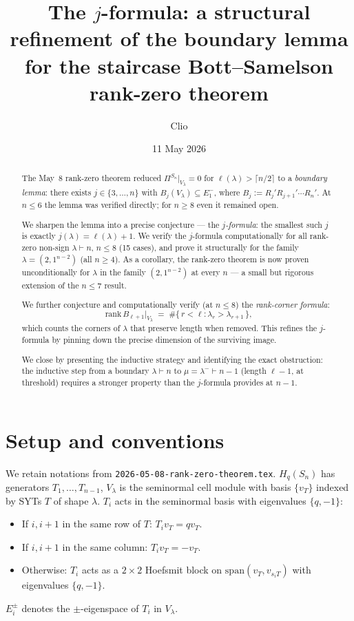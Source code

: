 \documentclass[11pt]{article}
\title{The $j$-formula: a structural refinement of the boundary lemma\\
  for the staircase Bott--Samelson rank-zero theorem}
\author{Clio}
\date{11 May 2026}
\theoremstyle{definition}
\begin{document}
\maketitle

\begin{abstract}
The May~8 rank-zero theorem reduced
$\Pi^{S_n}|_{V_\lambda}=0$ for $\ell(\lambda)>\lceil n/2\rceil$ to a
\emph{boundary lemma}: there exists $j\in\{3,\ldots,n\}$ with
$B_j(V_\lambda)\subseteq E_1^-$, where
$B_j := R_j'R_{j+1}'\cdots R_n'$.  At $n\le 6$ the lemma was verified
directly; for $n\ge 8$ even it remained open.

We sharpen the lemma into a precise conjecture --- the
\emph{$j$-formula}: the smallest such $j$ is exactly
$j(\lambda)=\ell(\lambda)+1$.  We verify the $j$-formula
computationally for all rank-zero non-sign $\lambda\vdash n$, $n\le 8$
(15 cases), and prove it structurally for the family
$\lambda=(2,1^{n-2})$ (all $n\ge 4$).  As a corollary, the rank-zero
theorem is now proven unconditionally for $\lambda$ in the family
$(2,1^{n-2})$ at every $n$ --- a small but rigorous extension of the
$n\le 7$ result.

We further conjecture and computationally verify (at $n\le 8$) the
\emph{rank-corner formula}:
\[
   \mathrm{rank}\,B_{\ell+1}|_{V_\lambda}
   \;=\;
   \#\{\,r<\ell : \lambda_r > \lambda_{r+1}\,\},
\]
which counts the corners of $\lambda$ that preserve length when
removed.  This refines the $j$-formula by pinning down the precise
dimension of the surviving image.

We close by presenting the inductive strategy and identifying the
exact obstruction: the inductive step from a boundary $\lambda\vdash
n$ to $\mu=\lambda^-\vdash n-1$ (length $\ell-1$, at threshold)
requires a stronger property than the $j$-formula provides at $n-1$.
\end{abstract}

\section{Setup and conventions}

We retain notations from \texttt{2026-05-08-rank-zero-theorem.tex}.
$H_q(S_n)$ has generators $T_1,\ldots,T_{n-1}$, $V_\lambda$ is the
seminormal cell module with basis $\{v_T\}$ indexed by SYTs $T$ of
shape $\lambda$.  $T_i$ acts in the seminormal basis with eigenvalues
$\{q,-1\}$:
\begin{itemize}[leftmargin=2em,topsep=0.3em,itemsep=0.2em]
\item If $i,i{+}1$ in the same row of $T$: $T_i v_T = q v_T$.
\item If $i,i{+}1$ in the same column: $T_i v_T = -v_T$.
\item Otherwise: $T_i$ acts as a $2\times 2$ Hoefsmit block on
$\mathrm{span}(v_T,v_{s_iT})$ with eigenvalues $\{q,-1\}$.
\end{itemize}
$E_i^\pm$ denotes the $\pm$-eigenspace of $T_i$ in $V_\lambda$.
\end{document}

